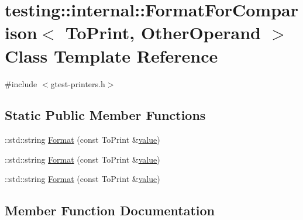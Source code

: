 \hypertarget{classtesting_1_1internal_1_1_format_for_comparison}{}\section{testing\+::internal\+::Format\+For\+Comparison$<$ To\+Print, Other\+Operand $>$ Class Template Reference}
\label{classtesting_1_1internal_1_1_format_for_comparison}


{\ttfamily \#include $<$gtest-\/printers.\+h$>$}

\subsection*{Static Public Member Functions}
\begin{DoxyCompactItemize}
\item 
\+::std\+::string \mbox{\hyperlink{classtesting_1_1internal_1_1_format_for_comparison_a2aeb688fc55b57abd3021d82eccad896}{Format}} (const To\+Print \&\mbox{\hyperlink{_obj__test_2lib_2googletest-master_2googlemock_2test_2gmock-matchers__test_8cc_a337b8a670efc0b086ad3af163f3121b6}{value}})
\item 
\+::std\+::string \mbox{\hyperlink{classtesting_1_1internal_1_1_format_for_comparison_a2aeb688fc55b57abd3021d82eccad896}{Format}} (const To\+Print \&\mbox{\hyperlink{_obj__test_2lib_2googletest-master_2googlemock_2test_2gmock-matchers__test_8cc_a337b8a670efc0b086ad3af163f3121b6}{value}})
\item 
\+::std\+::string \mbox{\hyperlink{classtesting_1_1internal_1_1_format_for_comparison_a2aeb688fc55b57abd3021d82eccad896}{Format}} (const To\+Print \&\mbox{\hyperlink{_obj__test_2lib_2googletest-master_2googlemock_2test_2gmock-matchers__test_8cc_a337b8a670efc0b086ad3af163f3121b6}{value}})
\end{DoxyCompactItemize}


\subsection{Member Function Documentation}
\mbox{\label{classtesting_1_1internal_1_1_format_for_comparison_a2aeb688fc55b57abd3021d82eccad896}} 
